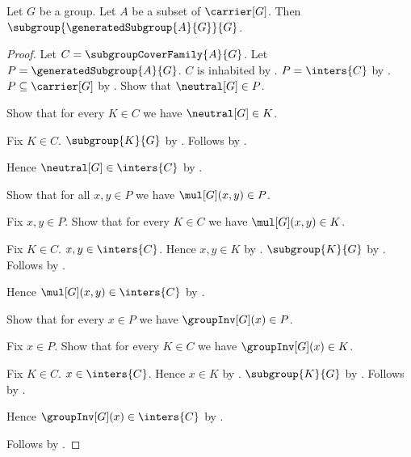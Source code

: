 \begin{theorem}\label{generated_subgroup_is_subgroup}
    Let $G$ be a group.
    Let $A$ be a subset of $\carrier[G]$.
    Then $\subgroup{\generatedSubgroup{A}{G}}{G}$.
\end{theorem}
\begin{proof}
    Let $C=\subgroupCoverFamily{A}{G}$.
    Let $P=\generatedSubgroup{A}{G}$.
    $C$ is inhabited by .
    $P=\inters{C}$ by .
    $P\subseteq\carrier[G]$ by
        .
    Show that $\neutral[G]\in P$.
    \begin{subproof}
        Show that for every $K\in C$ we have $\neutral[G]\in K$.
        \begin{subproof}
            Fix $K\in C$.
            $\subgroup{K}{G}$ by .
            Follows by .
        \end{subproof}
        Hence $\neutral[G]\in\inters{C}$ by .
    \end{subproof}
    Show that for all $x,y\in P$ we have $\mul[G](x,y)\in P$.
    \begin{subproof}
        Fix $x,y\in P$.
        Show that for every $K\in C$ we have $\mul[G](x,y)\in K$.
        \begin{subproof}
            Fix $K\in C$.
            $x,y\in\inters{C}$.
            Hence $x,y\in K$ by .
            $\subgroup{K}{G}$ by .
            Follows by .
        \end{subproof}
        Hence $\mul[G](x,y)\in\inters{C}$ by .
    \end{subproof}
    Show that for every $x\in P$ we have $\groupInv[G](x)\in P$.
    \begin{subproof}
        Fix $x\in P$.
        Show that for every $K\in C$ we have $\groupInv[G](x)\in K$.
        \begin{subproof}
            Fix $K\in C$.
            $x\in\inters{C}$.
            Hence $x\in K$ by .
            $\subgroup{K}{G}$ by .
            Follows by .
        \end{subproof}
        Hence $\groupInv[G](x)\in\inters{C}$ by .
    \end{subproof}
    Follows by .
\end{proof}

